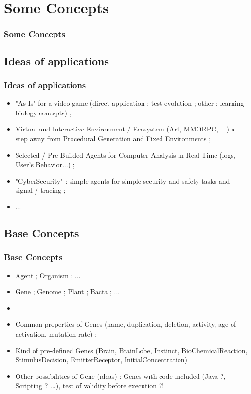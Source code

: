 \documentclass{beamer}
\begin{document}
\def\titleSectionFourthPart{Some Concepts}
\section{\titleSectionFourthPart }
\begin{frame}
	\frametitle{\titleSectionFourthPart }
	\tableofcontents[sections=4,currentsection,subsectionstyle=show/shaded/hide]
\end{frame} 

\def\titleSubSectionFourthPartOne{ Ideas of applications }
\subsection{ \titleSubSectionFourthPartOne }
\begin{frame}
	\frametitle{ \titleSubSectionFourthPartOne }
	\begin{itemize}
		\item "As Is" for a video game (direct application : test evolution ; other : learning biology concepts) ; 
		\item Virtual and Interactive Environment / Ecosystem (Art, MMORPG, ...) a step away from Procedural Generation and Fixed Environments ; 
		\item Selected / Pre-Builded Agents for Computer Analysis in Real-Time (logs, User's Behavior...) ; 
		\item "CyberSecurity" : simple agents for simple security and safety tasks and signal / tracing ; 
		\item ... 
	\end{itemize}
\end{frame}

\def\titleSubSectionFourthPartTwo{ Base Concepts }
\subsection{ \titleSubSectionFourthPartTwo }
\begin{frame}
	\frametitle{ \titleSubSectionFourthPartTwo }
	\begin{itemize}
		\item Agent ; Organism ; ... 
		\item Gene ; Genome ; Plant ; Bacta ; ...
		\item[] 
		\item Common properties of Genes (name, duplication, deletion, activity, age of activation, mutation rate) ; 
		\item Kind of pre-defined Genes (Brain, BrainLobe, Instinct, BioChemicalReaction, StimulusDecision, EmitterReceptor, InitialConcentration)
		\item Other possibilities of Gene (ideas) : Genes with code included (Java ?, Scripting ? ...), test of validity before execution ?!
	\end{itemize}
\end{frame}
\end{document}
